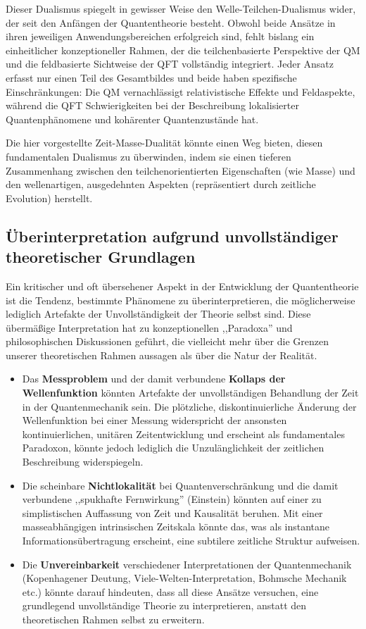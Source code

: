 \documentclass[12pt,a4paper]{article}  %
\begin{document}
	Dieser Dualismus spiegelt in gewisser Weise den Welle-Teilchen-Dualismus wider, der seit den Anfängen der Quantentheorie besteht. Obwohl beide Ansätze in ihren jeweiligen Anwendungsbereichen erfolgreich sind, fehlt bislang ein einheitlicher konzeptioneller Rahmen, der die teilchenbasierte Perspektive der QM und die feldbasierte Sichtweise der QFT vollständig integriert. Jeder Ansatz erfasst nur einen Teil des Gesamtbildes und beide haben spezifische Einschränkungen: Die QM vernachlässigt relativistische Effekte und Feldaspekte, während die QFT Schwierigkeiten bei der Beschreibung lokalisierter Quantenphänomene und kohärenter Quantenzustände hat.
	
	Die hier vorgestellte Zeit-Masse-Dualität könnte einen Weg bieten, diesen fundamentalen Dualismus zu überwinden, indem sie einen tieferen Zusammenhang zwischen den teilchenorientierten Eigenschaften (wie Masse) und den wellenartigen, ausgedehnten Aspekten (repräsentiert durch zeitliche Evolution) herstellt.
	
	\subsection{Überinterpretation aufgrund unvollständiger theoretischer Grundlagen}
	
	Ein kritischer und oft übersehener Aspekt in der Entwicklung der Quantentheorie ist die Tendenz, bestimmte Phänomene zu überinterpretieren, die möglicherweise lediglich Artefakte der Unvollständigkeit der Theorie selbst sind. Diese übermäßige Interpretation hat zu konzeptionellen ,,Paradoxa'' und philosophischen Diskussionen geführt, die vielleicht mehr über die Grenzen unserer theoretischen Rahmen aussagen als über die Natur der Realität.
	
	\begin{itemize}
		\item Das \textbf{Messproblem} und der damit verbundene \textbf{Kollaps der Wellenfunktion} könnten Artefakte der unvollständigen Behandlung der Zeit in der Quantenmechanik sein. Die plötzliche, diskontinuierliche Änderung der Wellenfunktion bei einer Messung widerspricht der ansonsten kontinuierlichen, unitären Zeitentwicklung und erscheint als fundamentales Paradoxon, könnte jedoch lediglich die Unzulänglichkeit der zeitlichen Beschreibung widerspiegeln.
		
		\item Die scheinbare \textbf{Nichtlokalität} bei Quantenverschränkung und die damit verbundene ,,spukhafte Fernwirkung'' (Einstein) könnten auf einer zu simplistischen Auffassung von Zeit und Kausalität beruhen. Mit einer masseabhängigen intrinsischen Zeitskala könnte das, was als instantane Informationsübertragung erscheint, eine subtilere zeitliche Struktur aufweisen.
		
		\item Die \textbf{Unvereinbarkeit} verschiedener Interpretationen der Quantenmechanik (Kopenhagener Deutung, Viele-Welten-Interpretation, Bohmsche Mechanik etc.) könnte darauf hindeuten, dass all diese Ansätze versuchen, eine grundlegend unvollständige Theorie zu interpretieren, anstatt den theoretischen Rahmen selbst zu erweitern.
	\end{itemize}
	
\end{document}
